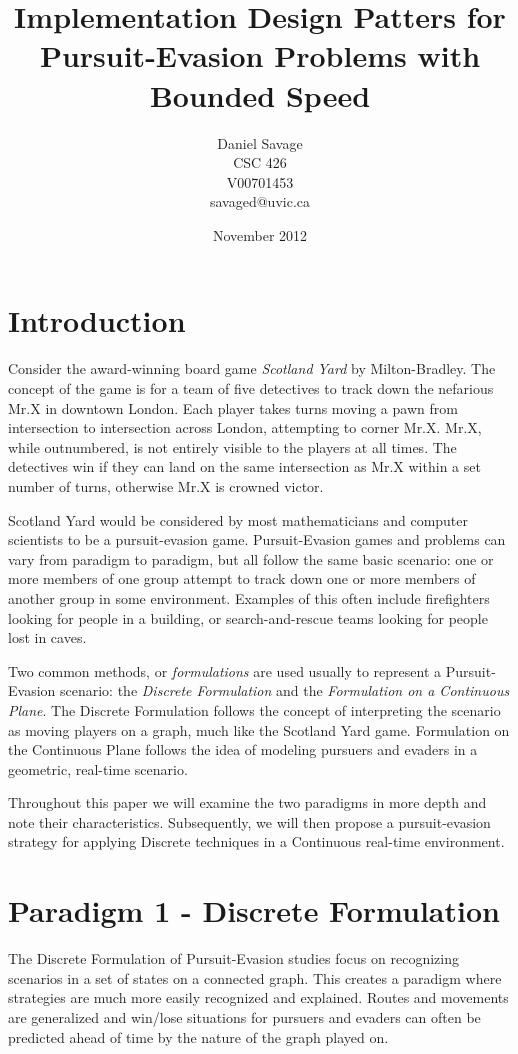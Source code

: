 \documentclass{article}
\begin{document}
\title{Implementation Design Patters for Pursuit-Evasion Problems with Bounded Speed}
\author{Daniel Savage\\CSC 426\\{V00701453}\\savaged@uvic.ca}
\date{November 2012}
\maketitle
\pagebreak

\section{Introduction}
Consider the award-winning board game \emph{Scotland Yard} by Milton-Bradley. The concept of the game is for a team of five detectives to track down the nefarious Mr.X in downtown London. Each player takes turns moving a pawn from intersection to intersection across London, attempting to corner Mr.X. Mr.X, while outnumbered, is not entirely visible to the players at all times. The detectives win if they can land on the same intersection as Mr.X within a set number of turns, otherwise Mr.X is crowned victor.

Scotland Yard would be considered by most mathematicians and computer scientists to be a pursuit-evasion game. Pursuit-Evasion games and problems can vary from paradigm to paradigm, but all follow the same basic scenario: one or more members of one group attempt to track down one or more members of another group in some environment. Examples of this often include firefighters looking for people in a building, or search-and-rescue teams looking for people lost in caves. \cite{parsons, robotics}

Two common methods, or \emph{formulations} are used usually to represent a Pursuit-Evasion scenario: the \emph{Discrete Formulation} and the \emph{Formulation on a Continuous Plane}. The Discrete Formulation follows the concept of interpreting the scenario as moving players on a graph, much like the Scotland Yard game. Formulation on the Continuous Plane follows the idea of modeling pursuers and evaders in a geometric, real-time scenario.

Throughout this paper we will examine the two paradigms in more depth and note their characteristics. Subsequently, we will then propose a pursuit-evasion strategy for applying Discrete techniques in a Continuous real-time environment.

\section{Paradigm 1 - Discrete Formulation}
The Discrete Formulation of Pursuit-Evasion studies focus on recognizing scenarios in a set of states on a connected graph. This creates a paradigm where strategies are much more easily recognized and explained. Routes and movements are generalized and win/lose situations for pursuers and evaders can often be predicted ahead of time by the nature of the graph played on.
\end{document}
